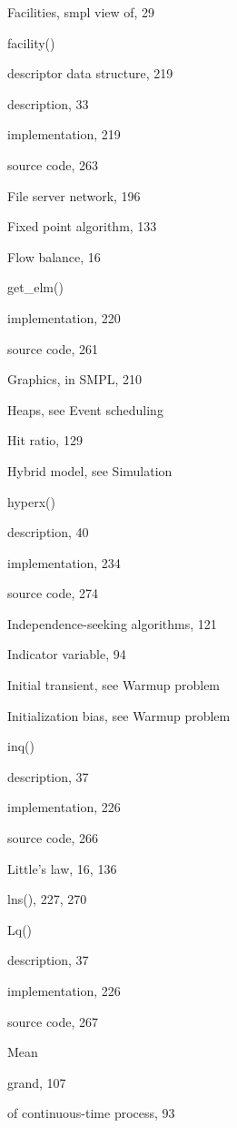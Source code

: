 \noindent Facilities, smpl view of, 29\par
\noindent facility()\par
\quad descriptor data structure, 219\par
\quad description, 33\par
\quad implementation, 219\par
\quad source code, 263\par
\noindent File server network, 196\par
\noindent Fixed point algorithm, 133\par
\noindent Flow balance, 16\par
\noindent get\_elm()\par
\quad implementation, 220\par
\quad source code, 261\par
\noindent Graphics, in SMPL, 210\par
\noindent Heaps, see Event scheduling\par
\noindent Hit ratio, 129\par
\noindent Hybrid model, see Simulation\par
\noindent hyperx()\par
\quad description, 40\par
\quad implementation, 234\par
\quad source code, 274\par
\noindent Independence-seeking algorithms, 121\par
\noindent Indicator variable, 94\par
\noindent Initial transient, see Warmup problem\par
\noindent Initialization bias, see Warmup problem\par
\noindent inq()\par
\quad description, 37\par
\quad implementation, 226\par
\quad source code, 266\par
\noindent Little's law, 16, 136\par
\noindent lns(), 227, 270\par
\noindent Lq()\par
\quad description, 37\par
\quad implementation, 226\par
\quad source code, 267\par
\noindent Mean\par
\quad grand, 107\par
\quad of continuous-time process, 93\par
